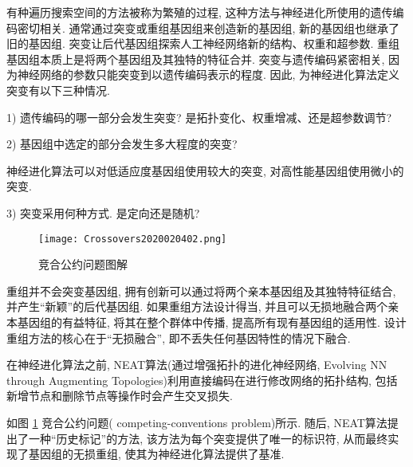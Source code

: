 \begin{remark}
    有种遍历搜索空间的方法被称为繁殖的过程, 这种方法与神经进化所使用的遗传编码密切相关.
    通常通过突变或重组基因组来创造新的基因组, 新的基因组也继承了旧的基因组.
    突变让后代基因组探索人工神经网络新的结构、权重和超参数. 重组基因组本质上是将两个基因组及其独特的特征合并.
突变与遗传编码紧密相关, 因为神经网络的参数只能突变到以遗传编码表示的程度. 因此, 为神经进化算法定义突变有以下三种情况.

1) 遗传编码的哪一部分会发生突变? 是拓扑变化、权重增减、还是超参数调节?

2) 基因组中选定的部分会发生多大程度的突变?
\begin{example}
    神经进化算法可以对低适应度基因组使用较大的突变, 对高性能基因组使用微小的突变.
\end{example}

3) 突变采用何种方式. 是定向还是随机?
\begin{figure}[H]
    \centering
    \texttt{[image: Crossovers2020020402.png]}
    \caption{竞合公约问题图解}
    \label{Crossovers2020020402}
\end{figure}

重组并不会突变基因组, 拥有创新可以通过将两个亲本基因组及其独特特征结合, 并产生“新颖”的后代基因组.
如果重组方法设计得当, 并且可以无损地融合两个亲本基因组的有益特征, 将其在整个群体中传播, 提高所有现有基因组的适用性.
设计重组方法的核心在于“无损融合”, 即不丢失任何基因特性的情况下融合.
\begin{example}
    在神经进化算法之前, NEAT算法(通过增强拓扑的进化神经网络, Evolving NN through Augmenting Topologies)利用直接编码在进行修改网络的拓扑结构, 包括新增节点和删除节点等操作时会产生交叉损失.
\end{example}

如图 \ref{Crossovers2020020402} 竞合公约问题( competing-conventions problem)所示.
随后, NEAT算法提出了一种“历史标记”的方法, 该方法为每个突变提供了唯一的标识符, 从而最终实现了基因组的无损重组, 使其为神经进化算法提供了基准.
\end{remark}

